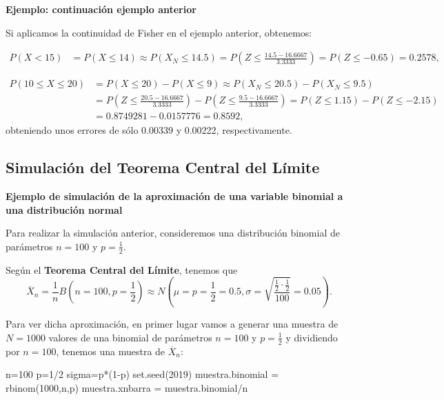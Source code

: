 \documentclass[
  letterpaper,
  DIV=11,
  numbers=noendperiod]{scrreprt}
\newenvironment{Shaded}{\begin{snugshade}}{\end{snugshade}}
\newcommand{\DecValTok}[1]{\textcolor[rgb]{0.68,0.00,0.00}{#1}}
\newcommand{\FunctionTok}[1]{\textcolor[rgb]{0.28,0.35,0.67}{#1}}
\newcommand{\NormalTok}[1]{\textcolor[rgb]{0.00,0.23,0.31}{#1}}
\newcommand{\OtherTok}[1]{\textcolor[rgb]{0.00,0.23,0.31}{#1}}
\newcommand{\SpecialCharTok}[1]{\textcolor[rgb]{0.37,0.37,0.37}{#1}}
\begin{document}
\textbf{Ejemplo: continuación ejemplo anterior}

Si aplicamos la continuidad de Fisher en el ejemplo anterior, obtenemos:

\[
\begin{array}{rl}
P(X< 15) & = P(X\leq 14) \approx P(X_N \leq 14.5)=P\left(Z\leq \frac{14.5-16.6667}{3.3333}\right) =P(Z\leq -0.65) = 0.2578,
\end{array}
\]

\[
\begin{array}{rl}
P(10\leq X\leq 20) &= P(X\leq 20)-P(X\leq 9)\approx P(X_N \leq 20.5)-P(X_N\leq 9.5) \\ & = P\left(Z\leq \frac{20.5-16.6667}{3.3333}\right) - P\left(Z\leq \frac{9.5-16.6667}{3.3333}\right)=  P(Z\leq 1.15)-P(Z\leq -2.15)\\ & =0.8749281-0.0157776 = 0.8592,
\end{array}
\] obteniendo unos errores de sólo 0.00339 y 0.00222, respectivamente.

\hypertarget{simulaciuxf3n-del-teorema-central-del-luxedmite}{%
\subsection{Simulación del Teorema Central del
Límite}\label{simulaciuxf3n-del-teorema-central-del-luxedmite}}

\textbf{Ejemplo de simulación de la aproximación de una variable
binomial a una distribución normal}

Para realizar la simulación anterior, consideremos una distribución
binomial de parámetros \(n=100\) y \(p=\frac{1}{2}\).

Según el \textbf{Teorema Central del Límite}, tenemos que \[
\overline{X}_n=\frac{1}{n}B\left(n=100,p=\frac{1}{2}\right)\approx N\left(\mu = p=\frac{1}{2}=0.5,\sigma=\sqrt{\frac{\frac{1}{2}\cdot \frac{1}{2}}{100}}=0.05\right).
\]

Para ver dicha aproximación, en primer lugar vamos a generar una muestra
de \(N=1000\) valores de una binomial de parámetros \(n=100\) y
\(p=\frac{1}{2}\) y dividiendo por \(n=100\), tenemos una muestra de
\(\overline{X}_n\):

\begin{Shaded}
\begin{Highlighting}[]
\NormalTok{n}\OtherTok{=}\DecValTok{100}
\NormalTok{p}\OtherTok{=}\DecValTok{1}\SpecialCharTok{/}\DecValTok{2}
\NormalTok{sigma}\OtherTok{=}\NormalTok{p}\SpecialCharTok{*}\NormalTok{(}\DecValTok{1}\SpecialCharTok{{-}}\NormalTok{p)}
\FunctionTok{set.seed}\NormalTok{(}\DecValTok{2019}\NormalTok{)}
\NormalTok{muestra.binomial }\OtherTok{=} \FunctionTok{rbinom}\NormalTok{(}\DecValTok{1000}\NormalTok{,n,p)}
\NormalTok{muestra.xnbarra }\OtherTok{=}\NormalTok{ muestra.binomial}\SpecialCharTok{/}\NormalTok{n}
\end{Highlighting}
\end{Shaded}
\end{document}
